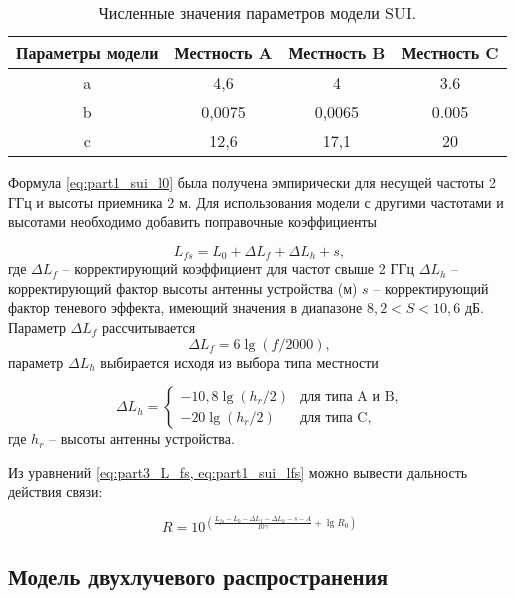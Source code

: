 \begin{longtable}[c]{| c | c | c | c |}
  \caption{Численные значения параметров модели SUI.}\label{tab:part1_abc_sui_model}\\

  \hline
  \textbf{Параметры модели} & \textbf{Местность A} & \textbf{Местность B} &  \textbf{Местность C}\\ \hline
  a & 4,6 & 4 & 3.6 \\
  b & 0,0075 & 0,0065 & 0.005 \\
  c & 12,6 & 17,1 &20 \\
  \hline
  \hline
\end{longtable}





Формула \cref{eq:part1_sui_l0} была получена эмпирически для несущей частоты 2 ГГц и высоты приемника 2 м. Для использования модели с другими частотами и высотами необходимо добавить поправочные коэффициенты 

\begin{equation}
  \label{eq:part1_sui_lfs}
  L_{fs} = L_0 + \Delta L_f + \Delta L_h + s,
\end{equation}
где $\Delta L_f$ -- корректирующий коэффициент для частот свыше 2 ГГц $\Delta L_h$ --  корректирующий фактор высоты антенны устройства (м) $s$ -- корректирующий фактор теневого эффекта, имеющий значения в диапазоне $8,2 < S < 10,6$ дБ. Параметр $\Delta L_f$ рассчитывается 
$$
\Delta L_f  = 6 \lg{(f / 2000)},
$$
параметр $\Delta L_h$ выбирается исходя из выбора типа местности

$$
\Delta L_h =  
 \begin{cases}
  -10,8 \lg{(h_r/2)} &\text{для типа A и B,}\\
  -20 \lg{(h_r/2)} &\text{для типа C,}
 \end{cases}
$$
где $h_r$ -- высоты антенны устройства.


Из уравнений \cref{eq:part3_L_fs, eq:part1_sui_lfs} можно вывести дальность действия связи:

\begin{equation}
  \label{eq:part1_sui_model_r}
  R = 10^{(\frac{L_{fs} - L_0 - \Delta L_f - \Delta L_h - s - A}{10\gamma} + \lg{R_0})}
\end{equation}

\subsection{Модель двухлучевого распространения}

